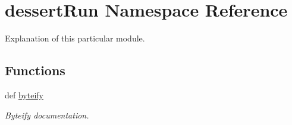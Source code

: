 \hypertarget{namespacedessertRun}{\section{dessert\-Run Namespace Reference}
\label{namespacedessertRun}
}


Explanation of this particular module.  


\subsection*{Functions}
\begin{DoxyCompactItemize}
\item 
def \hyperlink{namespacedessertRun_aad67f3fdc9c1541f0db0e8b794cbff41}{byteify}
\begin{DoxyCompactList}\small\item\em Byteify documentation. \end{DoxyCompactList}\end{DoxyCompactItemize}
